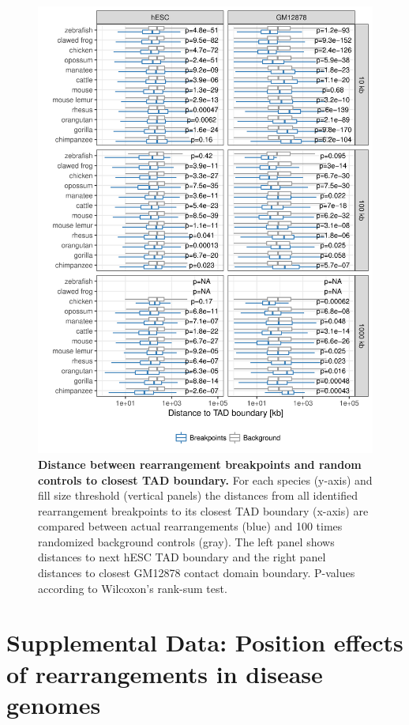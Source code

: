 \documentclass[a4paper,twoside=true,openright,parskip=full,chapterprefix=true,11pt,headings=normal,bibliography=totoc,listof=totoc,titlepage=on,captions=tableabove,draft=false]{scrreprt}
\theoremstyle{definition}
\theoremstyle{definition}
\theoremstyle{definition}
\theoremstyle{remark}
\begin{document}
\begin{figure}

{\centering \includegraphics[width=0.8\linewidth]{figures/TAD_evolution/fig_S2_v01} 

}

\caption{\textbf{Distance between rearrangement breakpoints and
random controls to closest TAD boundary.} For each species (y-axis) and
fill size threshold (vertical panels) the distances from all identified
rearrangement breakpoints to its closest TAD boundary (x-axis) are
compared between actual rearrangements (blue) and 100 times randomized
background controls (gray). The left panel shows distances to next hESC
TAD boundary and the right panel distances to closest GM12878 contact
domain boundary. P-values according to Wilcoxon's rank-sum test.}\label{fig:TadEvoS2}
\end{figure}










\hypertarget{sup-position-effect}{%
\chapter{Supplemental Data: Position effects of rearrangements in
disease genomes}\label{sup-position-effect}}
\end{document}

